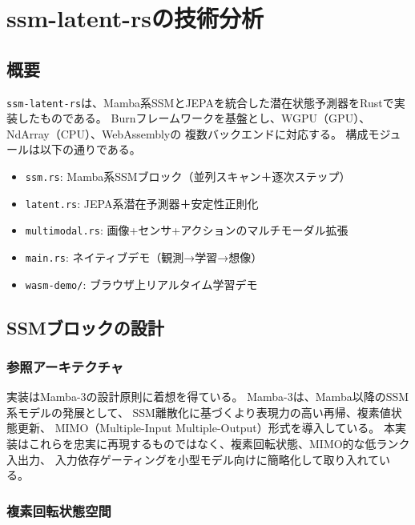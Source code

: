 \documentclass[11pt,a4paper]{ltjsarticle}
\begin{document}
\section{ssm-latent-rsの技術分析}

\subsection{概要}

\texttt{ssm-latent-rs}は、Mamba系SSMとJEPAを統合した潜在状態予測器をRustで実装したものである。
Burnフレームワーク\cite{burn}を基盤とし、WGPU（GPU）、NdArray（CPU）、WebAssemblyの
複数バックエンドに対応する。
構成モジュールは以下の通りである。

\begin{itemize}
  \item \texttt{ssm.rs}: Mamba系SSMブロック（並列スキャン＋逐次ステップ）
  \item \texttt{latent.rs}: JEPA系潜在予測器＋安定性正則化
  \item \texttt{multimodal.rs}: 画像+センサ+アクションのマルチモーダル拡張
  \item \texttt{main.rs}: ネイティブデモ（観測→学習→想像）
  \item \texttt{wasm-demo/}: ブラウザ上リアルタイム学習デモ
\end{itemize}

\subsection{SSMブロックの設計}

\subsubsection{参照アーキテクチャ}

実装はMamba-3\cite{mamba3_2026}の設計原則に着想を得ている。
Mamba-3は、Mamba\cite{gu2023mamba}以降のSSM系モデルの発展として、
SSM離散化に基づくより表現力の高い再帰、複素値状態更新、
MIMO（Multiple-Input Multiple-Output）形式を導入している。
本実装はこれらを忠実に再現するものではなく、複素回転状態、MIMO的な低ランク入出力、
入力依存ゲーティングを小型モデル向けに簡略化して取り入れている。

\subsubsection{複素回転状態空間}
\end{document}
